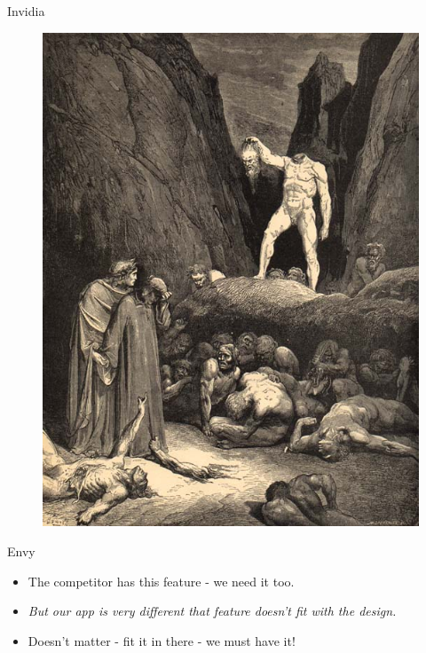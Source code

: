 \documentclass[12pt,xcolor=x11names]{beamer}
\begin{document}
\begin{frame}{Invidia}
    \begin{figure}
        \centering \includegraphics[height=0.75\textheight]{envy.jpg}
    \end{figure}
\end{frame}
\begin{frame}{Envy}
    \begin{itemize}
        \item The competitor has this feature - we need it too.
            \pause
        \item \emph{But our app is very different that feature doesn't fit with
            the design.} 
            \pause
        \item Doesn't matter - fit it in there - we must have it!
    \end{itemize}
\end{frame}
\end{document}
